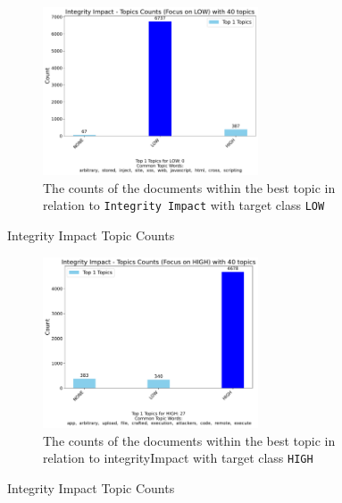 \documentclass[12pt]{article}
\begin{document}
\begin{figure}[h!]
	\ContinuedFloat
	\centering
	\begin{subfigure}{\textwidth}
		\centering
		\includegraphics[width=0.7\textwidth]{figures/integrityImpact/merged_top_k_topics_category_focus_counts_integrityImpact_LOW_k1.pdf}
		\caption{The counts of the documents within the best topic in relation to \texttt{Integrity Impact} with target class \texttt{LOW}}
		\label{fig:integrityImpact_60_LOW}
	\end{subfigure}

	\caption{Integrity Impact Topic Counts}
\end{figure}

\begin{figure}[h!]
	\ContinuedFloat
	\centering
	\begin{subfigure}{\textwidth}
		\centering
		\includegraphics[width=0.7\textwidth]{figures/integrityImpact/merged_top_k_topics_category_focus_counts_integrityImpact_HIGH_k1.pdf}
		\caption{The counts of the documents within the best topic in relation to integrityImpact with target class \texttt{HIGH}}
		\label{fig:integrityImpact_60_HIGH}
	\end{subfigure}

	\caption{Integrity Impact Topic Counts}
\end{figure}
\end{document}
